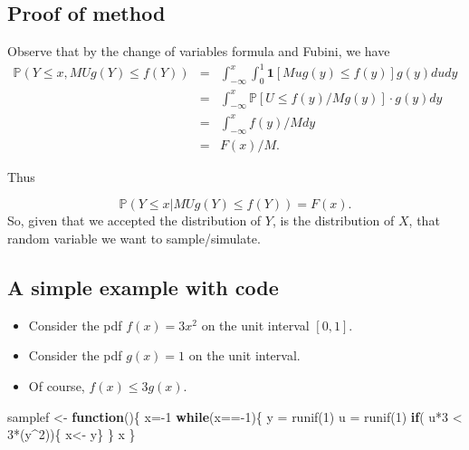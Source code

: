 \documentclass[
]{article}
\newenvironment{Shaded}{\begin{snugshade}}{\end{snugshade}}
\newcommand{\ControlFlowTok}[1]{\textcolor[rgb]{0.13,0.29,0.53}{\textbf{#1}}}
\newcommand{\DecValTok}[1]{\textcolor[rgb]{0.00,0.00,0.81}{#1}}
\newcommand{\FunctionTok}[1]{\textcolor[rgb]{0.00,0.00,0.00}{#1}}
\newcommand{\NormalTok}[1]{#1}
\newcommand{\OtherTok}[1]{\textcolor[rgb]{0.56,0.35,0.01}{#1}}
\newcommand{\SpecialCharTok}[1]{\textcolor[rgb]{0.00,0.00,0.00}{#1}}
\providecommand{\tightlist}{%
  \setlength{\itemsep}{0pt}\setlength{\parskip}{0pt}}
\theoremstyle{definition}
\theoremstyle{definition}
\theoremstyle{definition}
\theoremstyle{definition}
\theoremstyle{remark}
\begin{document}
\hypertarget{proof-of-method}{%
\subsection{Proof of method}\label{proof-of-method}}

Observe that by the change of variables formula and Fubini, we have
\begin{eqnarray*}
 \mathbb{P}(Y \leq x, MU g(Y) \leq f(Y)) 
&=& \int_{-\infty} ^x \int_0 ^1 \mathbf{1}[Mu g(y) \leq f(y)]g(y)dudy \\
&=&  \int_{-\infty} ^x  \mathbb{P}[U \leq f(y)/Mg(y)] \cdot g(y) dy \\
&=&  \int_{-\infty} ^x f(y)/M dy \\
&=&  F(x)/M.
\end{eqnarray*}

Thus

\[
\mathbb{P}(Y \leq x | MU g(Y) \leq f(Y)) = F(x).
\]
So, given that we accepted the distribution of \(Y\), is the distribution of \(X\), that random variable we want to sample/simulate.

\hypertarget{a-simple-example-with-code}{%
\subsection{A simple example with code}\label{a-simple-example-with-code}}

\begin{itemize}
\tightlist
\item
  Consider the pdf \(f(x) = 3x^2\) on the unit interval \([0,1]\).
\item
  Consider the pdf \(g(x) = 1\) on the unit interval.
\item
  Of course, \(f(x) \leq 3 g(x)\).
\end{itemize}

\begin{Shaded}
\begin{Highlighting}[]
\NormalTok{samplef }\OtherTok{\textless{}{-}} \ControlFlowTok{function}\NormalTok{()\{}
\NormalTok{x}\OtherTok{=}\SpecialCharTok{{-}}\DecValTok{1}
\ControlFlowTok{while}\NormalTok{(x}\SpecialCharTok{=={-}}\DecValTok{1}\NormalTok{)\{}
\NormalTok{y }\OtherTok{=} \FunctionTok{runif}\NormalTok{(}\DecValTok{1}\NormalTok{)}
\NormalTok{u }\OtherTok{=} \FunctionTok{runif}\NormalTok{(}\DecValTok{1}\NormalTok{)}
\ControlFlowTok{if}\NormalTok{( u}\SpecialCharTok{*}\DecValTok{3} \SpecialCharTok{\textless{}} \DecValTok{3}\SpecialCharTok{*}\NormalTok{(y}\SpecialCharTok{\^{}}\DecValTok{2}\NormalTok{))\{ x}\OtherTok{\textless{}{-}}\NormalTok{ y\}}
\NormalTok{\}}
\NormalTok{x}
\NormalTok{\}}
\end{Highlighting}
\end{Shaded}
\end{document}
